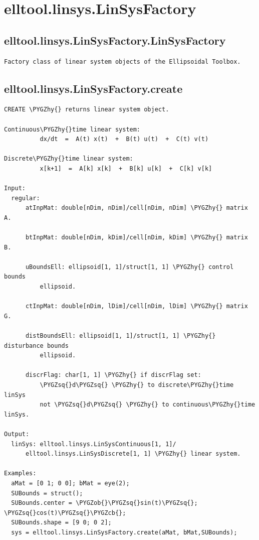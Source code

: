 \documentclass[letterpaper,10pt,english]{sphinxmanual}
\def\PYGZob{\char`\{}
\def\PYGZcb{\char`\}}
\def\PYGZhy{\char`\-}
\def\PYGZsq{\char`\'}
\begin{document}
\section{elltool.linsys.LinSysFactory}
\label{chap_functions:elltool-linsys-linsysfactory}

\subsection{elltool.linsys.LinSysFactory.LinSysFactory}
\label{chap_functions:elltool-linsys-linsysfactory-linsysfactory}
\begin{Verbatim}[commandchars=\\\{\}]
Factory class of linear system objects of the Ellipsoidal Toolbox.
\end{Verbatim}


\subsection{elltool.linsys.LinSysFactory.create}
\label{chap_functions:elltool-linsys-linsysfactory-create}
\begin{Verbatim}[commandchars=\\\{\}]
CREATE \PYGZhy{} returns linear system object.

Continuous\PYGZhy{}time linear system:
          dx/dt  =  A(t) x(t)  +  B(t) u(t)  +  C(t) v(t)

Discrete\PYGZhy{}time linear system:
          x[k+1]  =  A[k] x[k]  +  B[k] u[k]  +  C[k] v[k]

Input:
  regular:
      atInpMat: double[nDim, nDim]/cell[nDim, nDim] \PYGZhy{} matrix A.

      btInpMat: double[nDim, kDim]/cell[nDim, kDim] \PYGZhy{} matrix B.

      uBoundsEll: ellipsoid[1, 1]/struct[1, 1] \PYGZhy{} control bounds
          ellipsoid.

      ctInpMat: double[nDim, lDim]/cell[nDim, lDim] \PYGZhy{} matrix G.

      distBoundsEll: ellipsoid[1, 1]/struct[1, 1] \PYGZhy{} disturbance bounds
          ellipsoid.

      discrFlag: char[1, 1] \PYGZhy{} if discrFlag set:
          \PYGZsq{}d\PYGZsq{} \PYGZhy{} to discrete\PYGZhy{}time linSys
          not \PYGZsq{}d\PYGZsq{} \PYGZhy{} to continuous\PYGZhy{}time linSys.

Output:
  linSys: elltool.linsys.LinSysContinuous[1, 1]/
      elltool.linsys.LinSysDiscrete[1, 1] \PYGZhy{} linear system.

Examples:
  aMat = [0 1; 0 0]; bMat = eye(2);
  SUBounds = struct();
  SUBounds.center = \PYGZob{}\PYGZsq{}sin(t)\PYGZsq{}; \PYGZsq{}cos(t)\PYGZsq{}\PYGZcb{};
  SUBounds.shape = [9 0; 0 2];
  sys = elltool.linsys.LinSysFactory.create(aMat, bMat,SUBounds);
\end{Verbatim}
\end{document}
